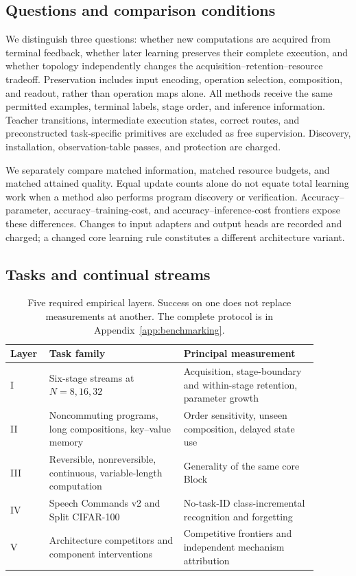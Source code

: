 \subsection{Questions and comparison conditions}

We distinguish three questions: whether new computations are acquired from
terminal feedback, whether later learning preserves their complete execution,
and whether topology independently changes the acquisition--retention--resource
tradeoff. Preservation includes input encoding, operation selection, composition,
and readout, rather than operation maps alone. All methods receive the same
permitted examples, terminal labels, stage order, and inference information.
Teacher transitions, intermediate execution states, correct routes, and
preconstructed task-specific primitives are excluded as free supervision.
Discovery, installation, observation-table passes, and protection are charged.

We separately compare matched information, matched resource budgets, and matched
attained quality. Equal update counts alone do not equate total learning work
when a method also performs program discovery or verification. Accuracy--parameter,
accuracy--training-cost, and accuracy--inference-cost frontiers expose these
differences. Changes to input adapters and output heads are recorded and charged;
a changed core learning rule constitutes a different architecture variant.

\subsection{Tasks and continual streams}

\begin{table}[t]
\centering
\small
\begin{tabular}{p{0.09\linewidth}p{0.40\linewidth}p{0.40\linewidth}}
\toprule
Layer & Task family & Principal measurement\\
\midrule
I & Six-stage streams at $N=8,16,32$ & Acquisition, stage-boundary and
within-stage retention, parameter growth\\
II & Noncommuting programs, long compositions, key--value memory & Order
sensitivity, unseen composition, delayed state use\\
III & Reversible, nonreversible, continuous, variable-length computation &
Generality of the same core Block\\
IV & Speech Commands v2 and Split CIFAR-100 & No-task-ID class-incremental
recognition and forgetting\\
V & Architecture competitors and component interventions & Competitive
frontiers and independent mechanism attribution\\
\bottomrule
\end{tabular}
\caption{Five required empirical layers. Success on one does not replace
measurements at another. The complete protocol is in Appendix~\ref{app:benchmarking}.}
\label{tab:main-evaluation-layers}
\end{table}

